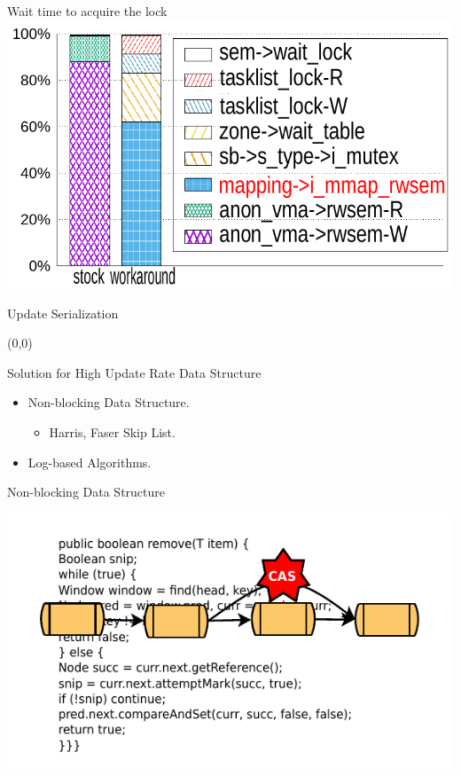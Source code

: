 \documentclass[english]{beamer} %
\begin{document}
\begin{frame}{Wait time to acquire the lock}
\includegraphics[scale=0.8]{fig/lockstat2}
\end{frame}


\begin{frame}{Update Serialization}
\begin{textblock}{1}(0,0)
\end{textblock}
\end{frame}

\begin{frame}{Solution for High Update Rate Data Structure}
    \begin{itemize}[<+-| alert@+>]
    \item Non-blocking Data Structure.
    \begin{itemize}
        \item Harris, Faser Skip List.
    \end{itemize}
    \item Log-based Algorithms. 
    \end{itemize}
\end{frame}


\begin{frame}{Non-blocking Data Structure}
\begin{center}
\includegraphics[scale=1.0]{fig/nonblock}
\end{center}
\end{frame}
\end{document}
